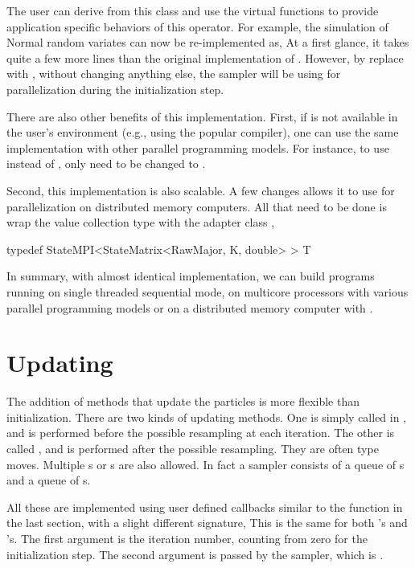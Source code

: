 The user can derive from this class and use the virtual functions to provide
application specific behaviors of this operator. For example, the simulation
of Normal random variates can now be re-implemented as,
At a first glance, it takes quite a few more lines than the original
implementation of . However, by replace
 with , without changing
anything else, the sampler will be using \openmp for parallelization during
the initialization step.

There are also other benefits of this implementation. First, if \openmp is not
available in the user's \cpp environment (e.g., using the popular \clang
\cite{clang} compiler), one can use the same implementation with other
parallel programming models. For instance, to use \tbb instead of \openmp,
only  need to be changed to
.

Second, this implementation is also scalable. A few changes allows it to use
\mpi for parallelization on distributed memory computers. All that need to be
done is wrap the value collection type with the adapter class
,
\begin{cppcode}
typedef StateMPI<StateMatrix<RawMajor, K, double> > T
\end{cppcode}

In summary, with almost identical implementation, we can build programs
running on single threaded sequential mode, on multicore processors with
various parallel programming models or on a distributed memory computer with
\mpi.

\section{Updating}
\label{sec:Updating}

The addition of methods that update the particles is more flexible than
initialization. There are two kinds of updating methods. One is simply called
 in \vsmc, and is performed before the possible resampling at
each iteration. The other is called , and is performed after
the possible resampling. They are often \mcmc type moves. Multiple
s or s are also allowed. In fact a \vsmc
sampler consists of a queue of s and a queue of
s.

All these are implemented using user defined callbacks similar to the
 function in the last section, with a slight different
signature,
This is the same for both 's and 's. The first
argument is the iteration number, counting from zero for the initialization
step. The second argument is passed by the sampler, which is
.


